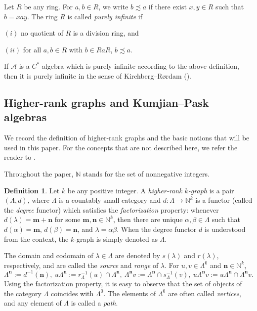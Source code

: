 \documentclass[a4paper,reqno,12pt]{amsart}
\numberwithin{equation}{section}
\theoremstyle{definition}
\newtheorem{dfn}[thm]{Definition}
\theoremstyle{remark}
\newcommand{\N}{\mathbf{n}}
\newcommand{\M}{\mathbf{m}}
\begin{document}
Let $R$ be any ring. For $a,b\in R$, we write $b\precsim a$ if there exist $x,y\in R$ such that $b=xay$. The ring $R$ is called \emph{purely infinite} \cite{AGPM} if 

$(i)$ no quotient of $R$ is a division ring, and 

$(ii)$ for all $a,b\in R$ with $b\in RaR$, $b\precsim a$.

If $\mathcal{A}$ is a $C^*$-algebra which is purely infinite according to the above definition, then it is purely infinite in the sense of Kirchberg--R\o rdam (\cite[Proposition 3.17]{AGPM}). 

\subsection{Higher-rank graphs and Kumjian--Pask algebras}\label{ssec hr graph} 
We record the definition of higher-rank graphs and the basic notions that will be used in this paper. For the concepts that are not described here, we refer the reader to \cite{Pino,HLM, HMPS1, KumjianPask}.

Throughout the paper, $\mathbb{N}$ stands for the set of nonnegative integers. 
\begin{dfn}\label{def higher-rank graphs}
Let $k$ be any positive integer. A \emph{higher-rank $k$-graph} is a pair $(\Lambda,d)$, where $\Lambda$ is a countably small category and $d:\Lambda\longrightarrow \mathbb{N}^k$ is a functor (called the \emph{degree} functor) which satisfies the \emph{factorization} property: whenever $d(\lambda)=\M+\N$ for some $\M,\N\in \mathbb{N}^k$, then there are unique $\alpha,\beta\in \Lambda$ such that $d(\alpha)=\M$, $d(\beta)=\N$, and $\lambda=\alpha\beta$. When the degree functor $d$ is understood from the context, the $k$-graph is simply denoted as $\Lambda$. 
\end{dfn}
The domain and codomain of $\lambda\in \Lambda$ are denoted by $s(\lambda)$ and $r(\lambda)$, respectively, and are called the \emph{source} and \emph{range} of $\lambda$. For $u,v\in \Lambda^0$ and $\N\in \mathbb{N}^k$, \[\Lambda^\N:=d^{-1}(\N),~u\Lambda^\mathbf{n}:=r_\Lambda^{-1}(u)\cap \Lambda^\mathbf{n},~\Lambda^\mathbf{n} v:=\Lambda^\mathbf{n}\cap s_\Lambda^{-1}(v),~u\Lambda^\mathbf{n} v:=u\Lambda^\mathbf{n} \cap \Lambda^\mathbf{n} v.\] 
Using the factorization property, it is easy to observe that the set of objects of the category $\Lambda$ coincides with $\Lambda^0$. The elements of $\Lambda^0$ are often called \emph{vertices}, and any element of $\Lambda$ is called a \emph{path}. 
\end{document}
